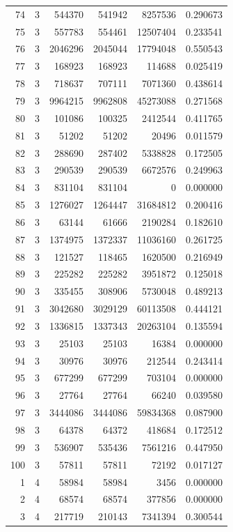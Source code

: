 \begin{longtable}{rrrrrr}
74 & 3 & 544370 & 541942 & 8257536 & 0.290673\\
75 & 3 & 557783 & 554461 & 12507404 & 0.233541\\
76 & 3 & 2046296 & 2045044 & 17794048 & 0.550543\\
77 & 3 & 168923 & 168923 & 114688 & 0.025419\\
78 & 3 & 718637 & 707111 & 7071360 & 0.438614\\
79 & 3 & 9964215 & 9962808 & 45273088 & 0.271568\\
80 & 3 & 101086 & 100325 & 2412544 & 0.411765\\
81 & 3 & 51202 & 51202 & 20496 & 0.011579\\
82 & 3 & 288690 & 287402 & 5338828 & 0.172505\\
83 & 3 & 290539 & 290539 & 6672576 & 0.249963\\
84 & 3 & 831104 & 831104 & 0 & 0.000000\\
85 & 3 & 1276027 & 1264447 & 31684812 & 0.200416\\
86 & 3 & 63144 & 61666 & 2190284 & 0.182610\\
87 & 3 & 1374975 & 1372337 & 11036160 & 0.261725\\
88 & 3 & 121527 & 118465 & 1620500 & 0.216949\\
89 & 3 & 225282 & 225282 & 3951872 & 0.125018\\
90 & 3 & 335455 & 308906 & 5730048 & 0.489213\\
91 & 3 & 3042680 & 3029129 & 60113508 & 0.444121\\
92 & 3 & 1336815 & 1337343 & 20263104 & 0.135594\\
93 & 3 & 25103 & 25103 & 16384 & 0.000000\\
94 & 3 & 30976 & 30976 & 212544 & 0.243414\\
95 & 3 & 677299 & 677299 & 703104 & 0.000000\\
96 & 3 & 27764 & 27764 & 66240 & 0.039580\\
97 & 3 & 3444086 & 3444086 & 59834368 & 0.087900\\
98 & 3 & 64378 & 64372 & 418684 & 0.172512\\
99 & 3 & 536907 & 535436 & 7561216 & 0.447950\\
100 & 3 & 57811 & 57811 & 72192 & 0.017127\\
1 & 4 & 58984 & 58984 & 3456 & 0.000000\\
2 & 4 & 68574 & 68574 & 377856 & 0.000000\\
3 & 4 & 217719 & 210143 & 7341394 & 0.300544\\

\end{longtable}
